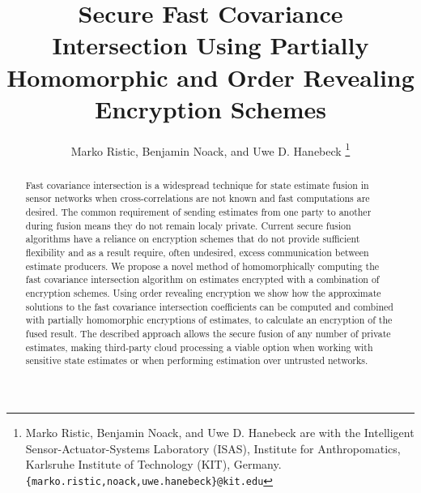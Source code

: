 \documentclass[letterpaper, 10 pt, conference]{ieeeconf}  %
\title{\LARGE \bf
Secure Fast Covariance Intersection Using Partially Homomorphic and Order Revealing Encryption Schemes
}
\author{Marko Ristic, Benjamin Noack, and Uwe D. Hanebeck%
\thanks{Marko Ristic, Benjamin Noack, and Uwe D. Hanebeck are with the Intelligent Sensor-Actuator-Systems Laboratory (ISAS), Institute for Anthropomatics, Karlsruhe Institute of Technology (KIT), Germany.\newline
{\tt\small \{marko.ristic,noack,uwe.hanebeck\}@kit.edu}%
}%
}
\begin{document}
\maketitle
\thispagestyle{empty}
\pagestyle{empty}




\begin{abstract}

Fast covariance intersection is a widespread technique for state estimate fusion in sensor networks when cross-correlations are not known and fast computations are desired. The common requirement of sending estimates from one party to another during fusion means they do not remain localy private. Current secure fusion algorithms have a reliance on encryption schemes that do not provide sufficient flexibility and as a result require, often undesired, excess communication between estimate producers. We propose a novel method of homomorphically computing the fast covariance intersection algorithm on estimates encrypted with a combination of encryption schemes. Using order revealing encryption we show how the approximate solutions to the fast covariance intersection coefficients can be computed and combined with partially homomorphic encryptions of estimates, to calculate an encryption of the fused result. The described approach allows the secure fusion of any number of private estimates, making third-party cloud processing a viable option when working with sensitive state estimates or when performing estimation over untrusted networks.

\end{abstract}



\end{document}
